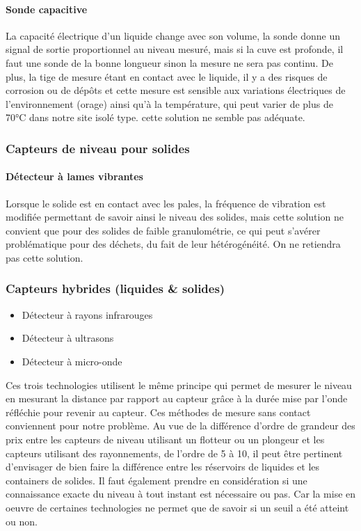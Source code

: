 \paragraph{Sonde capacitive}
La capacité électrique d'un liquide change avec son volume, la sonde donne un signal de sortie proportionnel au niveau mesuré, mais si la cuve est profonde, il faut une sonde de la bonne longueur sinon la mesure ne sera pas continu. De plus, la tige de mesure étant en contact avec le liquide, il y a des risques de corrosion ou de dépôts et cette mesure est sensible aux variations électriques de l'environnement (orage) ainsi qu'à la température, qui peut varier de plus de 70°C dans notre site isolé type. cette solution ne semble pas adéquate.

\subsubsection{Capteurs de niveau pour solides} 

\paragraph{Détecteur à lames vibrantes}

Lorsque le solide est en contact avec les pales, la fréquence de vibration est modifiée permettant de savoir ainsi le niveau des solides, mais cette solution ne convient que pour des solides de faible granulométrie, ce qui peut s'avérer problématique pour des déchets, du fait de leur hétérogénéité. On ne retiendra pas cette solution.

\subsubsection{Capteurs hybrides (liquides \&  solides)}

\begin{itemize}
\item Détecteur à rayons infrarouges
\item Détecteur à ultrasons
\item Détecteur à micro-onde
\end{itemize}

Ces trois technologies utilisent le même principe qui permet de mesurer le niveau en mesurant la distance par rapport au capteur grâce à la durée mise par l'onde réfléchie pour revenir au capteur. Ces méthodes de mesure sans contact conviennent pour notre problème.
Au vue de la différence d'ordre de grandeur des prix entre les capteurs de niveau utilisant un flotteur ou un plongeur et les capteurs utilisant des rayonnements, de l'ordre de 5 à 10\footnotemark, il peut être pertinent d'envisager de bien faire la différence entre les réservoirs de liquides et les containers de solides. Il faut également prendre en considération si une connaissance exacte du niveau à tout instant est nécessaire ou pas. Car la mise en oeuvre de certaines technologies ne permet que de savoir si un seuil a été atteint ou non.

